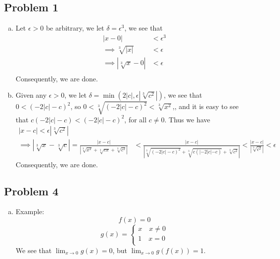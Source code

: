 \documentclass[12pt]{article}
\begin{document}
\subsection*{Problem 1}
\begin{enumerate}[a).]
    \item {
        Let $\epsilon > 0$ be arbitrary, we let $\delta = \epsilon^3$, we see that 
        \begin{align*}
            |x - 0| &< \epsilon^3\\
            \implies \sqrt[3]{|x|} &< \epsilon\\
            \implies |\sqrt[3]{x} - 0| &< \epsilon\\
        \end{align*}
        Consequently, we are done. 
    }
    \item {
        Given any $\epsilon > 0$, we let $\delta = \min(2|c|, \epsilon|\sqrt[3]{c^2}|)$, we see that  $0 < (-2|c| - c)^2$, so $0 < \sqrt[3]{(-2|c| - c)^2} < \sqrt[3]{x^2} $,, and it is easy to see that $c(-2|c| - c) < (-2|c| - c)^2$, for all $c \ne 0$.
        Thus we have
        \begin{align*}
            |x - c| < \epsilon |\sqrt[3]{c^2}| \\
            \implies |\sqrt[3]{x} - \sqrt[3]{c}| = \frac{|x-c|}{|\sqrt[3]{x^2} + \sqrt[3]{cx} +\sqrt[3]{c^2}|} &< \frac{|x-c|}{|\sqrt[3]{(-2|c| - c)^2} + \sqrt[3]{c(|-2|c| - c)} +\sqrt[3]{c^2}|} < \frac{|x-c|}{|\sqrt[3]{c^2}| } < \epsilon
        \end{align*}
        Consequently, we are done.
    }
\end{enumerate}

\subsection*{Problem 4}
\begin{enumerate}[a).]
    \item {
        Example: \\
        $$ 
        f(x) = 0
        $$
        $$ 
        g(x) = \left\{ 
            \begin{array}{ll} 
                x \quad   x \ne 0\\
                1 \quad   x = 0\\
            \end{array} \right.
        $$
        We see that $\lim_{x\rightarrow 0}g(x) = 0$, but $\lim_{x\rightarrow 0} g(f(x))= 1$. 

    }
\end{enumerate}
\end{document}
